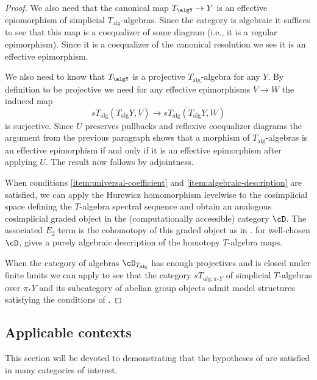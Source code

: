 \documentclass[leqno,oneside,english]{elsarticle}
\begin{document}
\begin{proof}
{{{{We also need that the canonical map $T_\algY\rightarrow Y$ is an
effective epiomorphism of simplicial $T_{\mathrm{alg}}$-algebras. Since the
category is algebraic it suffices to see that this map is a
coequalizer of some diagram (i.e., it is a regular epimorphism). Since
it is a coequalizer of the canonical resolution we see it is an
effective epimorphism.
 
We also need to know that $T_\algY$ is a projective
$T_{\mathrm{alg}}$-algebra for any $Y$. By definition to be projective we
need for any effective epimorphisms $V\rightarrow W$ the induced
map \[sT_{\mathrm{alg}}(T_{\mathrm{alg}} Y, V)\rightarrow sT_{\mathrm{alg}}(T_{\mathrm{alg}} Y, W)\] is
surjective. Since $U$ preserves pullbacks and reflexive
coequalizer diagrams the argument from the previous
paragraph shows that a morphism of $T_{\mathrm{alg}}$-algebras is an
effective epimorphism if and only if it is an effective epimorphism
after applying $U$. The result now follows by adjointness. 

When conditions \eqref{item:universal-coefficient} and \eqref{item:algebraic-description} are satisfied, we can apply the Hurewicz homomorphism levelwise
to the cosimplicial space defining the $T$-algebra spectral sequence and
obtain an analogous cosimplicial graded object in the (computationally
accessible) category $\cD$.  The associated $E_2$ term is the cohomotopy of
this graded object as in \cite{Bou89}.  for well-chosen $\cD$, gives a purely
algebraic description of the homotopy $T$-algebra maps.

When the category of algebras $\cD_{T_{\mathrm{alg}}}$ has enough projectives and
is closed under finite limits we can
apply \cite[\S~1]{Qui70} to see that the category $sT_{alg,\pi_*Y}$ of
simplicial $T$-algebras over $\pi_*Y$ and its subcategory of abelian
group objects admit model structures satisfying the conditions of
\cite[II.5.(1),(2),(4)]{Qui67}.

}}
\fi}}{}\end{proof}

\subsection{Applicable contexts}\label{sec:verification-of-examples}
This section will be devoted to demonstrating that the hypotheses of
 are satisfied in many categories of interest.
\end{document}
